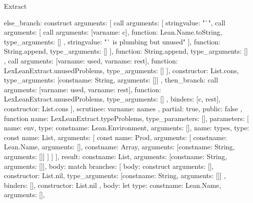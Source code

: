 \begin{lexlean}{Extract}
\begin{toolingmodule}
{{{{{              else_branch: construct{
                arguments: [
                  call{
                    arguments: [
                      string{value: "`"},
                      call{
                        arguments: [
                          call{
                            arguments: [var{name: c}],
                            function: Lean.Name.toString,
                            type_arguments: []
                          },
                          string{value: "` is plumbing but unused"}
                        ],
                        function: String.append,
                        type_arguments: []
                      }
                    ],
                    function: String.append,
                    type_arguments: []
                  },
                  call{
                    arguments: [var{name: used}, var{name: rest}],
                    function: LexLeanExtract.unusedProblems,
                    type_arguments: []
                  }
                ],
                constructor: List.cons,
                type_arguments: [const{name: String, arguments: []}]
              },
              then_branch: call{
                arguments: [var{name: used}, var{name: rest}],
                function: LexLeanExtract.unusedProblems,
                type_arguments: []
              }
            },
            binders: [c, rest],
            constructor: List.cons
          }
        ],
        scrutinee: var{name: names}
      },
      partial: true,
      public: false
    },
    function{
      name: LexLeanExtract.typeProblems,
      type_parameters: [],
      parameters: [
        {name: env, type: const{name: Lean.Environment, arguments: []}},
        {
          name: types,
          type: const{
            name: List,
            arguments: [
              const{
                name: Prod,
                arguments: [
                  const{name: Lean.Name, arguments: []},
                  const{name: Array, arguments: [const{name: String, arguments: []}]}
                ]
              }
            ]
          }
        }
      ],
      result: const{name: List, arguments: [const{name: String, arguments: []}]},
      body: match{
        branches: [
          {
            body: construct{
              arguments: [],
              constructor: List.nil,
              type_arguments: [const{name: String, arguments: []}]
            },
            binders: [],
            constructor: List.nil
          },
          {
            body: let{
              type: const{name: Lean.Name, arguments: []},
}}}}}
\end{toolingmodule}
\end{lexlean}
